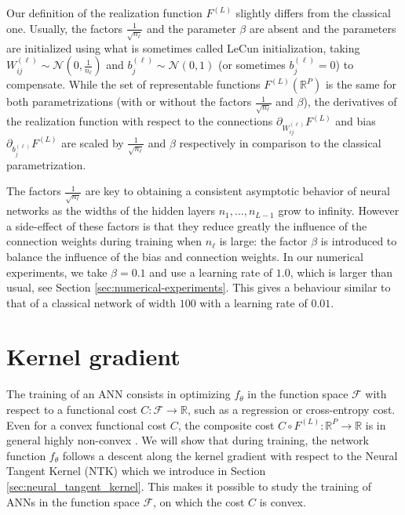 \begin{rem}\label{rem:parametrization}
Our definition of the realization function $F^{(L)}$ slightly differs from the classical one. Usually, the factors $\frac{1}{\sqrt{n_\ell}}$ and the parameter $\beta$ are absent and the parameters are initialized using what is sometimes called LeCun initialization, taking $W^{(\ell)}_{ij} \sim \mathcal{N}(0, \frac{1}{n_\ell})$ and $b^{(\ell)}_{j} \sim \mathcal{N}(0, 1)$ (or sometimes $b^{(\ell)}_{j} = 0$) to compensate. While the set of representable functions $F^{(L)}(\mathbb{R}^P)$ is the same for both parametrizations (with or without the factors $\frac{1}{\sqrt{n_\ell}}$ and $\beta$), the derivatives of the realization function with respect to the connections $\partial_{W_{ij}^{(\ell)}} F^{(L)}$ and bias $\partial_{b_{j}^{(\ell)}} F^{(L)}$ are scaled by $\frac{1}{\sqrt{n_\ell}}$ and $\beta$ respectively in comparison to the classical parametrization.

The factors $\frac{1}{\sqrt{n_\ell}}$ are key to obtaining a consistent asymptotic behavior of neural networks as the widths of the hidden layers $n_1, ..., n_{L-1}$ grow to infinity. However a side-effect of these factors is that they reduce greatly the influence of the connection weights during training when $n_\ell$ is large: the factor $\beta$ is introduced to balance the influence of the bias and connection weights. In our numerical experiments, we take $\beta=0.1$ and use a learning rate of $1.0$, which is larger than usual, see Section \ref{sec:numerical-experiments}. This gives a behaviour similar to that of a classical network of width $100$ with a learning rate of $0.01$.
\end{rem}

\section{Kernel gradient}\label{sec:kernel_gradient}
The training of an ANN consists in optimizing $f_\theta$ in the function space $\mathcal{F}$ with respect to a functional cost $C : \mathcal{F} \to \mathbb{R}$, such as a regression or cross-entropy cost. Even for a convex functional cost $C$, the composite cost $C \circ F^{(L)} : \mathbb{R}^P \to \mathbb{R}$ is in general highly non-convex \citep{Choromanska}. We will show that during training, the network function $f_\theta$ follows a descent along the kernel gradient with respect to the Neural Tangent Kernel (NTK) which we introduce in Section \ref{sec:neural_tangent_kernel}. This makes it possible to study the training of ANNs in the function space $\mathcal{F}$, on which the cost $C$ is convex.

